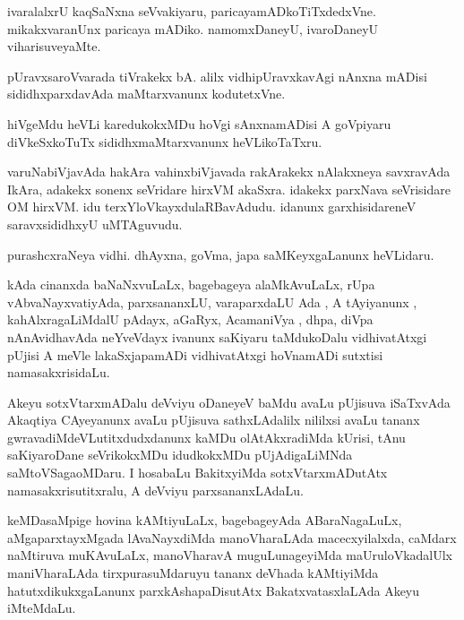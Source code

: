 \documentclass{article}
\begin{document}
\begin{mn}%
ivaralalxrU kaqSaNxna seVvakiyaru, paricayamADkoTiTxdedxVne. mikakxvaranUnx paricaya mADiko.
namomxDaneyU, ivaroDaneyU viharisuveyaMte.
\end{mn}

\begin{mn}%
pUravxsaroVvarada tiVrakekx bA. alilx vidhipUravxkavAgi nAnxna mADisi sididhxparxdavAda 
maMtarxvanunx kodutetxVne.
\end{mn}

\begin{mn}%
hiVgeMdu heVLi karedukokxMDu hoVgi sAnxnamADisi A goVpiyaru diVkeSxkoTuTx 
sididhxmaMtarxvanunx heVLikoTaTxru.
\end{mn}

\begin{mn}%
varuNabiVjavAda hakAra vahinxbiVjavada rakArakekx nAlakxneya savxravAda IkAra, adakekx 
sonenx seVridare hirxVM akaSxra. idakekx parxNava seVrisidare OM hirxVM. idu 
terxYloVkayxdulaRBavAdudu. idanunx garxhisidareneV saravxsididhxyU uMTAguvudu.
\end{mn}

\begin{mn}%
purashcxraNeya vidhi. dhAyxna, goVma, japa saMKeyxgaLanunx heVLidaru.
\end{mn}

\begin{mn}%
kAda cinanxda baNaNxvuLaLx, bagebageya alaMkAvuLaLx, rUpa vAbvaNayxvatiyAda, parxsananxLU, 
varaparxdaLU Ada , A tAyiyanunx , kahAlxragaLiMdalU pAdayx, aGaRyx, AcamaniVya , dhpa, 
diVpa nAnAvidhavAda neYveVdayx ivanunx saKiyaru taMdukoDalu vidhivatAtxgi pUjisi A meVle 
lakaSxjapamADi vidhivatAtxgi hoVnamADi sutxtisi namasakxrisidaLu.
\end{mn}

\begin{mn}%
Akeyu sotxVtarxmADalu deVviyu oDaneyeV baMdu avaLu pUjisuva iSaTxvAda Akaqtiya CAyeyanunx 
avaLu pUjisuva sathxLAdalilx nililxsi avaLu tananx gwravadiMdeVLutitxdudxdanunx kaMDu 
olAtAkxradiMda kUrisi, tAnu saKiyaroDane seVrikokxMDu idudkokxMDu pUjAdigaLiMNda 
saMtoVSagaoMDaru. I hosabaLu BakitxyiMda sotxVtarxmADutAtx namasakxrisutitxralu, A deVviyu 
parxsananxLAdaLu.
\end{mn}

\begin{mn}%
keMDasaMpige hovina kAMtiyuLaLx, bagebageyAda ABaraNagaLuLx, aMgaparxtayxMgada 
lAvaNayxdiMda manoVharaLAda macecxyilalxda, caMdarx naMtiruva muKAvuLaLx, manoVharavA 
muguLunageyiMda maUruloVkadalUlx maniVharaLAda tirxpurasuMdaruyu tananx deVhada kAMtiyiMda 
hatutxdikukxgaLanunx parxkAshapaDisutAtx BakatxvatasxlaLAda Akeyu iMteMdaLu.
\end{mn}
\end{document}
